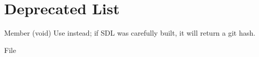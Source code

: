 \chapter{Deprecated List}
\hypertarget{deprecated}{}\label{deprecated}

\begin{DoxyRefList}
\item[Member \doxylink{_s_d_l__version_8h_a3aaf4a973a60915fd9a30de51b17c3e4}{SDL\+\_\+\+Get\+Revision\+Number} (void)]\label{deprecated__deprecated000002}%
%
Use  instead; if SDL was carefully built, it will return a git hash. 
\item[File \doxylink{_s_d_l__types_8h}{SDL\+\_\+types.h} ]\label{deprecated__deprecated000001}%
%
 
\end{DoxyRefList}